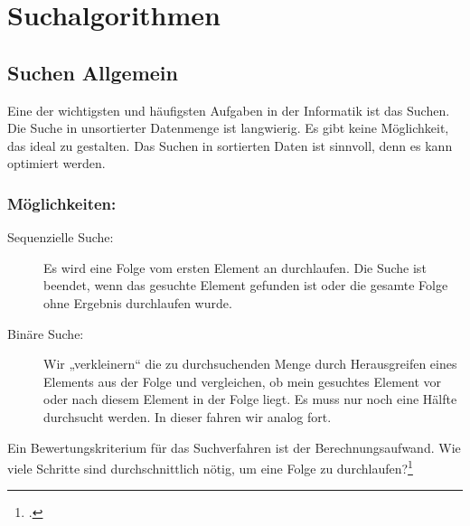 \documentclass{lehramt-informatik-haupt}
\begin{document}

\chapter{Suchalgorithmen}

\begin{liQuellen}
\item \cite[Seite 120-123]{saake}
\end{liQuellen}

%

\section{Suchen Allgemein}

Eine der wichtigsten und häufigsten Aufgaben in der Informatik ist das
Suchen.
%
Die Suche in unsortierter Datenmenge ist langwierig. Es gibt keine
Möglichkeit, das ideal zu gestalten.
%
Das Suchen in sortierten Daten ist sinnvoll, denn es kann optimiert
werden.

\subsection{Möglichkeiten:}

\begin{description}
\item[Sequenzielle Suche:] Es wird eine Folge vom ersten Element an
durchlaufen. Die Suche ist beendet, wenn das gesuchte Element gefunden
ist oder die gesamte Folge ohne Ergebnis durchlaufen wurde.

\item[Binäre Suche:] Wir „verkleinern“ die zu durchsuchenden Menge durch
Herausgreifen eines Elements aus der Folge und vergleichen, ob mein
gesuchtes Element vor oder nach diesem Element in der Folge liegt. Es
muss nur noch eine Hälfte durchsucht werden. In dieser fahren wir analog
fort.
\end{description}

Ein Bewertungskriterium für das Suchverfahren ist der
Berechnungsaufwand. Wie viele Schritte sind durchschnittlich nötig, um
eine Folge zu durchlaufen?\footcite[Seite 16 (PDF 8)]{aud:fs:2}
\end{document}
